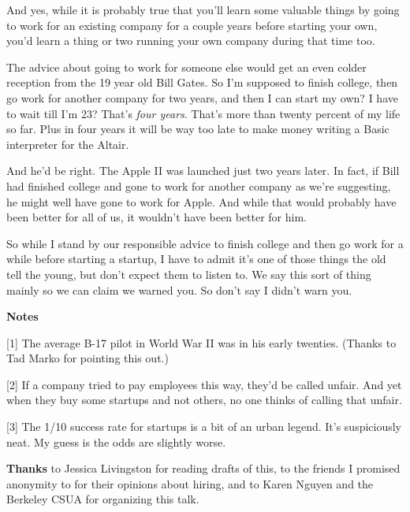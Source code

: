 And yes, while it is
                  probably true that you'll learn some valuable things by going
                  to work for an existing company for a couple years before
                  starting your own, you'd learn a thing or two running your own
                  company during that time too.

The advice about
                  going to work for someone else would get an even colder
                  reception from the 19 year old Bill Gates. So I'm supposed to
                  finish college, then go work for another company for two
                  years, and then I can start my own? I have to wait till I'm
                  23? That's \emph{four years}. That's more than twenty percent
                  of my life so far. Plus in four years it will be way too late
                  to make money writing a Basic interpreter for the Altair.

And
                  he'd be right. The Apple II was launched just two years later.
                  In fact, if Bill had finished college and gone to work for
                  another company as we're suggesting, he might well have gone
                  to work for Apple. And while that would probably have been
                  better for all of us, it wouldn't have been better for him.

So
                  while I stand by our responsible advice to finish college and
                  then go work for a while before starting a startup, I have to
                  admit it's one of those things the old tell the young, but
                  don't expect them to listen to. We say this sort of thing
                  mainly so we can claim we warned you. So don't say I didn't
                  warn you.




                  \textbf{Notes}

[1] The average B-17 pilot in World War II was in his early
                  twenties. (Thanks to Tad Marko for pointing this out.)

[2] If a company tried to pay employees this way, they'd be
                  called unfair. And yet when they buy some startups and not
                  others, no one thinks of calling that unfair.
                  

[3] The 1/10 success rate for startups is a bit of an urban
                  legend. It's suspiciously neat. My guess is the odds are
                  slightly worse.

\textbf{Thanks} to Jessica Livingston
                  for reading drafts of this, to the friends I promised
                  anonymity to for their opinions about hiring, and to Karen
                  Nguyen and the Berkeley CSUA for organizing this talk.



              
            
          
